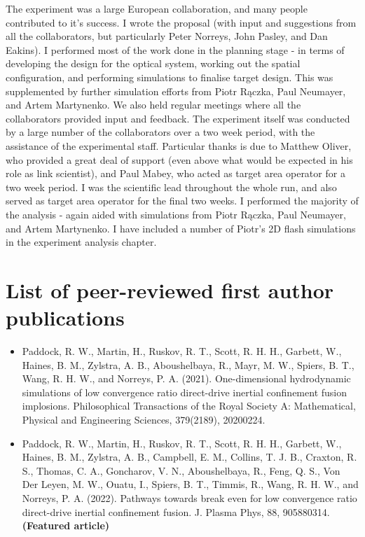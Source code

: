 The experiment was a large European collaboration, and many people contributed to it's success. I wrote the proposal (with input and suggestions from all the collaborators, but particularly Peter Norreys, John Pasley, and Dan Eakins). I performed most of the work done in the planning stage - in terms of developing the design for the optical system, working out the spatial configuration, and performing simulations to finalise target design. This was supplemented by further simulation efforts from Piotr R\k{a}czka, Paul Neumayer, and Artem Martynenko. We also held regular meetings where all the collaborators provided input and feedback. The experiment itself was conducted by a large number of the collaborators over a two week period, with the assistance of the experimental staff. Particular thanks is due to Matthew Oliver, who provided a great deal of support (even above what would be expected in his role as link scientist), and Paul Mabey, who acted as target area operator for a two week period. I was the scientific lead throughout the whole run, and also served as target area operator for the final two weeks. I performed the majority of the analysis - again aided with simulations from Piotr R\k{a}czka, Paul Neumayer, and Artem Martynenko. I have included a number of Piotr's 2D flash simulations in the experiment analysis chapter.

\section{List of peer-reviewed first author publications}

\begin{itemize}
	\item Paddock, R. W., Martin, H., Ruskov, R. T., Scott, R. H. H., Garbett, W., Haines, B. M., Zylstra, A. B., Aboushelbaya, R., Mayr, M. W., Spiers, B. T., Wang, R. H. W., and Norreys, P. A. (2021). One-dimensional hydrodynamic simulations of low convergence ratio direct-drive inertial confinement fusion implosions. Philosophical Transactions of the Royal Society A: Mathematical, Physical and Engineering Sciences, 379(2189), 20200224.
	\item Paddock, R. W., Martin, H., Ruskov, R. T., Scott, R. H. H., Garbett, W., Haines, B. M., Zylstra, A. B., Campbell, E. M., Collins, T. J. B., Craxton, R. S., Thomas, C. A., Goncharov, V. N., Aboushelbaya, R., Feng, Q. S., Von Der Leyen, M. W., Ouatu, I., Spiers, B. T., Timmis, R., Wang, R. H. W., and Norreys, P. A. (2022). Pathways towards break even for low convergence ratio direct-drive inertial confinement fusion. J. Plasma Phys, 88, 905880314. \textbf{(Featured article)}
\end{itemize}

